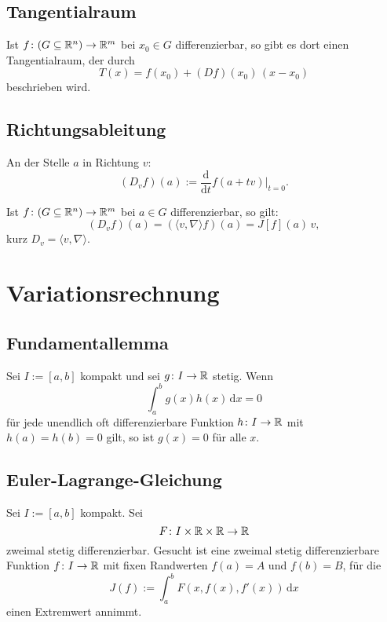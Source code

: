 \subsection{Tangentialraum}
Ist $f\colon (G\subseteq\mathbb R^n)\to\mathbb R^m$ bei $x_0\in G$ differenzierbar,
so gibt es dort einen Tangentialraum, der durch
\begin{equation}
T(x) = f(x_0)+(Df)(x_0)\,(x-x_0)
\end{equation}
beschrieben wird.

\subsection{Richtungsableitung}
\begin{definition}[Richtungsableitung]
An der Stelle $a$ in Richtung $v$:
\begin{equation}
(D_v f)(a) := \frac{\mathrm d}{\mathrm dt}f(a+tv)\Big|_{t=0}.
\end{equation}
\end{definition}
\noindent
Ist $f\colon (G\subseteq\mathbb R^n)\to\mathbb R^m$ bei $a\in G$ differenzierbar,
so gilt:%
\begin{equation}
(D_v f)(a) = (\langle v,\nabla\rangle f)(a) = J[f](a)\,v,
\end{equation}
kurz $D_v = \langle v,\nabla\rangle$.

\section{Variationsrechnung}

\subsection{Fundamentallemma}

Sei $I:=[a,b]$ kompakt und sei $g\colon I\to\mathbb R$
stetig. Wenn 
\begin{equation}
\int_a^b g(x)h(x)\,\mathrm dx=0
\end{equation}
für jede unendlich oft differenzierbare Funktion $h\colon I\to\mathbb R$
mit $h(a)=h(b)=0$ gilt, so ist $g(x)=0$ für alle $x$.

\subsection{Euler-Lagrange-Gleichung}

Sei $I:=[a,b]$ kompakt. Sei
\begin{equation}
F\colon I\times\mathbb R\times\mathbb R\to\mathbb R
\end{equation}
zweimal stetig differenzierbar. Gesucht ist eine zweimal
stetig differenzierbare Funktion $f\colon I\to\mathbb R$ mit fixen
Randwerten $f(a)=A$ und $f(b)=B$, für die
\begin{equation}
J(f) := \int_a^b F(x,f(x),f'(x))\,\mathrm dx
\end{equation}
einen Extremwert annimmt.

